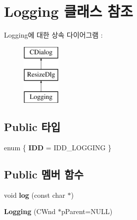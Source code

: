 \hypertarget{class_logging}{}\section{Logging 클래스 참조}
\label{class_logging}
Logging에 대한 상속 다이어그램 \+: \begin{figure}[H]
\begin{center}
\leavevmode
\includegraphics[height=3.000000cm]{class_logging}
\end{center}
\end{figure}
\subsection*{Public 타입}
\begin{DoxyCompactItemize}
\item 
\mbox{\label{class_logging_a6590c79913651cd5b099a01eb6159aff}} 
enum \{ {\bfseries I\+DD} = I\+D\+D\+\_\+\+L\+O\+G\+G\+I\+NG
 \}
\end{DoxyCompactItemize}
\subsection*{Public 멤버 함수}
\begin{DoxyCompactItemize}
\item 
\mbox{\label{class_logging_a01865a1ae55994b43fb518909bbe1552}} 
void {\bfseries log} (const char $\ast$)
\item 
\mbox{\label{class_logging_a84ca355086d1c4e35b3db0b68126a0cd}} 
{\bfseries Logging} (C\+Wnd $\ast$p\+Parent=N\+U\+LL)
\end{DoxyCompactItemize}
